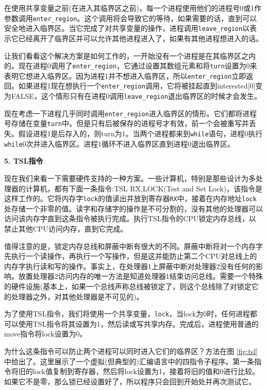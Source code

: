 	在使用共享变量之前(在进入其临界区之前)，每一个进程使用他们的进程号0或1作参数调用\texttt{enter\_region}。这个调用将会导致它的等待，如果需要的话，直到可以安全地进入临界区。当它完成了对共享变量的操作，进程调用\texttt{leave\_region}以表示它已经离开了临界区并可以允许其他进程进入了，如果有其他进程想进入的话。
	
	让我们看看这个解决方案是如何工作的，一开始没有一个进程是在其临界区之内的。现在进程0调用了\texttt{enter\_region}，它通过设置其数组元素和将\texttt{turn}设置为0来表明它想进入临界区。因为进程1并不想进入临界区，所以\texttt{enter\_region}立即返回。如果进程1现在想执行一个\texttt{enter\_region}调用，它将被挂起直到interested[0]变为FALSE，这个情形只有在进程0调用\texttt{leave\_region}退出临界区的时候才会发生。
	
	现在考虑一下进程几乎同时调用\texttt{enter\_region}进入临界区的情形。它们都将进程号存储在变量\texttt{turn}中。但是只有后被保存的进程号才有效，前一个会被重写并丢失。假设进程1是后存入的，则turn为1。当两个进程都来到\texttt{while}语句，进程0执行\texttt{while}0次并进入临界区。进程1循环不进入临界区直到进程0退出临界区。
	
	\textbf{5. TSL指令}
	
	现在我们来看一下需要硬件支持的一种方案。一些计算机，特别是那些设计为多处理器的计算机，都有下面一条指令:TSL RX,LOCK(Test and Set Lock)，该指令是这样工作的。它将内存字\texttt{lock}的值读出并放到寄存器\texttt{RX}中，接着在内存地址\texttt{lock}处存储一个非零的值。读字和存储字的操作是不可分割的，没有其他的处理器可以访问该内存字直到这条指令被执行完成。执行TSL指令的CPU锁定内存总线，以禁止其他CPU访问内存，直到它完成。
	
	值得注意的是，锁定内存总线和屏蔽中断有很大的不同。屏蔽中断将对一个内存字先执行一个读操作，再执行一个写操作，但是这并能防止第二个CPU对总线上的内存字执行读和写的操作。事实上，在处理器1上屏蔽中断对处理器2没有任何的影响。放置处理器2访问内存的唯一方法是知道处理器1结束访问总线。需要一个特殊的硬件设施(基本上，如果一个总线声称总线被锁定了，则这个总线除了对锁定它的处理器之外，对其他处理器是不可见的)。
	
	为了使用TSL指令，我们将使用一个共享变量，\texttt{lock}，当lock为0时，任何进程都可以使用TSL指令将其设置为1，然后读或写共享内存。完成后，进程使用普通的move指令将lock设置为0。
	
	为什么这条指令可以防止两个进程可以同时进入它们的临界区？方法在图 \ref{fig:tsl} 中给出了。这里展示了一个虚拟(但典型的)汇编语言中的四指令子程序。第一条指令将旧的lock值复制到寄存器，然后将lock设置为1，接着将旧的值和0进行比较。如果它不是零，那么锁已经设置好了，所以程序只会回到开始处并再次测试它。
	
